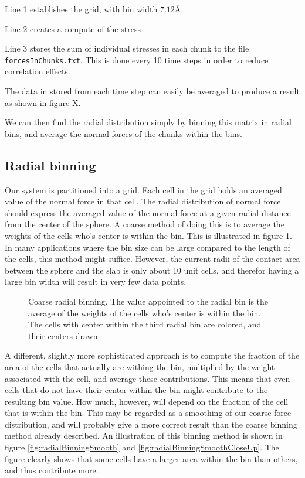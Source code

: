 \documentclass[twoside,english]{uiofysmaster}
\begin{document}
Line 1 establishes the grid, with bin width $7.12$Å.

Line 2 creates a compute of the stress

Line 3 stores the sum of individual stresses in each chunk to the file \texttt{forcesInChunks.txt}. 
This is done every 10 time steps in order to reduce correlation effects. 

The data in stored from each time step can easily be averaged to produce a result as shown in figure X.

We can then find the radial distribution simply by binning this matrix in radial bins, and average the normal forces of the chunks within the bins.

\subsection{Radial binning}
Our system is partitioned into a grid. 
Each cell in the grid holds an averaged value of the normal force in that cell. 
The radial distribution of normal force should express the averaged value of the normal force at a given radial distance from the {\color{editColor}center of the sphere}. 
A coarse method of doing this is to average the weights of the cells who's center is within the bin. 
This is illustrated in figure \ref{fig:radialBinningChoars}. 
In many applications where the bin size can be large compared to the length of the cells, this method might suffice.
However, the current radii of the contact area between the sphere and the slab is only about 10 unit cells, and therefor having a large bin width will result in very few data points. 

 \begin{figure}
 	\center
 	\resizebox{0.48\linewidth}{!}{
 		
 	}
 	\caption{Coarse radial binning. The value appointed to the radial bin is the average of the weights of the cells who's center is within the bin. The cells with center within the third radial bin are colored, and their centers drawn.}
 	\label{fig:radialBinningChoars}
 \end{figure}

A different, slightly more sophisticated approach is to compute the fraction of the area of the cells that actually are withing the bin, multiplied by the weight associated with the cell, and average these contributions. 
This means that even cells that do not have their center within the bin might contribute to the resulting bin value. 
How much, however, will depend on the fraction of the cell that is within the bin.
This may be regarded as a smoothing of our coarse force distribution, and will probably give a more correct result than the coarse binning method already described. An illustration of this binning method is shown in figure \ref{fig:radialBinningSmooth} and \ref{fig:radialBinningSmoothCloseUp}.
The figure clearly shows that some cells have a larger area within the bin than others, and thus contribute more. 
\end{document}
